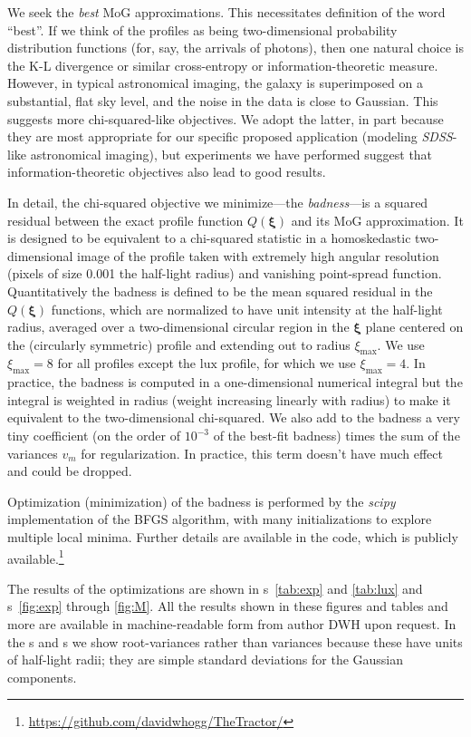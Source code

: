\documentclass[12pt,pdftex,preprint]{aastex}
\newcommand{\project}[1]{\textsl{#1}}
\newcommand{\sdss}{\project{SDSS}}
\newcommand{\tvector}[1]{\boldsymbol{#1}}
\newcommand{\spos}{\tvector{\xi}}
\newcommand{\lux}{\mathrm{lux}}
\begin{document}
We seek the \emph{best} MoG approximations.  This necessitates
definition of the word ``best''.  If we think of the profiles as being
two-dimensional probability distribution functions (for, say, the
arrivals of photons), then one natural choice is the K-L divergence or
similar cross-entropy or information-theoretic measure.  However, in
typical astronomical imaging, the galaxy is superimposed on a
substantial, flat sky level, and the noise in the data is close to
Gaussian.  This suggests more chi-squared-like objectives.  We adopt
the latter, in part because they are most appropriate for our specific
proposed application (modeling \sdss-like astronomical imaging), but
experiments we have performed suggest that information-theoretic
objectives also lead to good results.

In detail, the chi-squared objective we minimize---the
\emph{badness}---is a squared residual between the exact profile
function $Q(\spos)$ and its MoG approximation.  It is designed to be
equivalent to a chi-squared statistic in a homoskedastic
two-dimensional image of the profile taken with extremely high angular
resolution (pixels of size 0.001 the half-light radius) and vanishing
point-spread function.  Quantitatively the badness is defined to be
the mean squared residual in the $Q(\spos)$ functions, which are
normalized to have unit intensity at the half-light radius, averaged
over a two-dimensional circular region in the $\spos$ plane centered
on the (circularly symmetric) profile and extending out to radius
$\xi_{\max}$.  We use $\xi_{\max}=8$ for all profiles except the
$\lux$ profile, for which we use $\xi_{\max}=4$.  In practice, the
badness is computed in a one-dimensional numerical integral but the
integral is weighted in radius (weight increasing linearly with
radius) to make it equivalent to the two-dimensional chi-squared.  We
also add to the badness a very tiny coefficient (on the order of
$10^{-3}$ of the best-fit badness) times the sum of the variances
$v_m$ for regularization.  In practice, this term doesn't have much
effect and could be dropped.

Optimization (minimization) of the badness is performed by the
\project{scipy} implementation of the BFGS algorithm, with many
initializations to explore multiple local minima.  Further details are
available in the code, which is publicly
available.\footnote{\url{https://github.com/davidwhogg/TheTractor/}}

The results of the optimizations are shown in \tablename
s~\ref{tab:exp} and \ref{tab:lux} and \figurename s~\ref{fig:exp}
through \ref{fig:M}.  All the results shown in these figures and
tables and more are available in machine-readable form from author DWH
upon request.  In the \tablename s and \figurename s we show
root-variances rather than variances because these have units of
half-light radii; they are simple standard deviations for the Gaussian
components.
\end{document}
